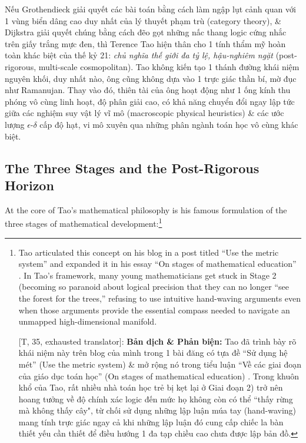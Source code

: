 \documentclass[11pt]{article}
\begin{document}
Nếu Grothendieck giải quyết các bài toán bằng cách làm ngập lụt cảnh quan với 1 vùng biển dâng cao duy nhất của lý thuyết phạm trù (category theory), \& Dijkstra giải quyết chúng bằng cách đẽo gọt những nấc thang logic cứng nhắc trên giấy trắng mực đen, thì Terence Tao hiện thân cho 1 tính thẩm mỹ hoàn toàn khác biệt của thế kỷ 21: \emph{chủ nghĩa thế giới đa tỷ lệ, hậu-nghiêm ngặt} (post-rigorous, multi-scale cosmopolitan). Tao không kiến tạo 1 thánh đường khái niệm nguyên khối, duy nhất nào, ông cũng không dựa vào 1 trực giác thần bí, mờ đục như Ramanujan. Thay vào đó, thiên tài của ông hoạt động như 1 ống kính thu phóng vô cùng linh hoạt, độ phân giải cao, có khả năng chuyển đổi ngay lập tức giữa các nghiệm suy vật lý vĩ mô (macroscopic physical heuristics) \& các ước lượng $\epsilon$-$\delta$ cấp độ hạt, vi mô xuyên qua những phân ngành toán học vô cùng khác biệt.

\subsection{The Three Stages and the Post-Rigorous Horizon}
At the core of Tao's mathematical philosophy is his famous formulation of the three stages of mathematical development:\footnote{Tao articulated this concept on his blog in a post titled ``Use the metric system'' \cite{tao_metric} and expanded it in his essay ``On stages of mathematical education'' \cite{tao_stages}. In Tao's framework, many young mathematicians get stuck in Stage 2 (becoming so paranoid about logical precision that they can no longer ``see the forest for the trees,'' refusing to use intuitive hand-waving arguments even when those arguments provide the essential compass needed to navigate an unmapped high-dimensional manifold.
	
	\textsf{[T, 35, exhausted translator]:} \textbf{Bản dịch \& Phản biện:} Tao đã trình bày rõ khái niệm này trên blog của mình trong 1 bài đăng có tựa đề ``Sử dụng hệ mét'' (Use the metric system) \cite{tao_metric} \& mở rộng nó trong tiểu luận ``Về các giai đoạn của giáo dục toán học'' (On stages of mathematical education) \cite{tao_stages}. Trong khuôn khổ của Tao, rất nhiều nhà toán học trẻ bị kẹt lại ở Giai đoạn 2) trở nên hoang tưởng về độ chính xác logic đến mức họ không còn có thể ``thấy rừng mà không thấy cây", từ chối sử dụng những lập luận múa tay (hand-waving) mang tính trực giác ngay cả khi những lập luận đó cung cấp chiếc la bàn thiết yếu cần thiết để điều hướng 1 đa tạp chiều cao chưa được lập bản đồ.}
\end{document}

